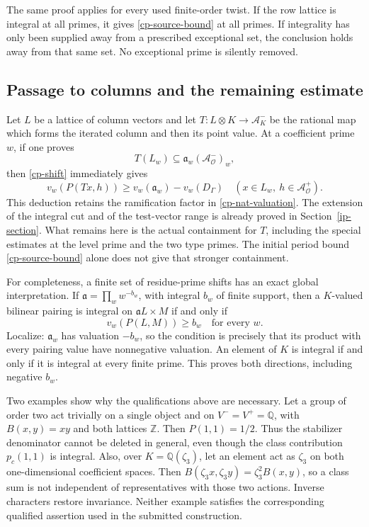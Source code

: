 The same proof applies for every used finite-order twist.
If the row lattice is integral at all primes, it gives
\eqref{cp-source-bound} at all primes. If integrality has
only been supplied away from a prescribed exceptional set,
the conclusion holds away from that same set. No exceptional
prime is silently removed.

\subsection{Passage to columns and the remaining estimate}

Let $L$ be a lattice of column vectors and let
$T:L\otimes K\to\mathcal A^-_K$ be the rational map
which forms the iterated column and then its point value.
At a coefficient prime $w$, if one proves
\[
                  T(L_w)\subseteq\mathfrak a_w
                                      (\mathcal A^-_{\mathcal O})_w,
\]
then \eqref{cp-shift} immediately gives
\begin{equation}\label{cp-column-bound}
 v_w(P(Tx,h))\ge v_w(\mathfrak a_w)-v_w(D_\Gamma)
       \quad(x\in L_w,\ h\in\mathcal A^+_{\mathcal O}).
\end{equation}
This deduction retains the ramification factor in
\eqref{cp-nat-valuation}. The extension of the integral
cut and of the test-vector range is already proved in
Section~\ref{ip-section}. What remains here is the actual
containment for $T$, including the special estimates at
the level prime and the two type primes. The initial
period bound \eqref{cp-source-bound} alone does not give
that stronger containment.

For completeness, a finite set of residue-prime shifts has
an exact global interpretation. If $\mathfrak a=\prod_w w^{-b_w}$,
with integral $b_w$ of finite support, then a $K$-valued
bilinear pairing is integral on $\mathfrak a L\times M$
if and only if
\[
                     v_w(P(L,M))\ge b_w\quad\text{for every }w.
\]
Localize: $\mathfrak a_w$ has valuation $-b_w$, so the
condition is precisely that its product with every pairing
value have nonnegative valuation. An element of $K$ is
integral if and only if it is integral at every finite prime.
This proves both directions, including negative $b_w$.

Two examples show why the qualifications above are necessary.
Let a group of order two act trivially on a single object
and on $V^-=V^+=\mathbb Q$, with $B(x,y)=xy$ and both
lattices $\mathbb Z$. Then $P(1,1)=1/2$. Thus the
stabilizer denominator cannot be deleted in general, even
though the class contribution $p_c(1,1)$ is integral.
Also, over $K=\mathbb Q(\zeta_3)$, let an element act as
$\zeta_3$ on both one-dimensional coefficient spaces.
Then $B(\zeta_3x,\zeta_3y)=\zeta_3^2B(x,y)$, so a
class sum is not independent of representatives with those
two actions. Inverse characters restore invariance. Neither
example satisfies the corresponding qualified assertion
used in the submitted construction.



